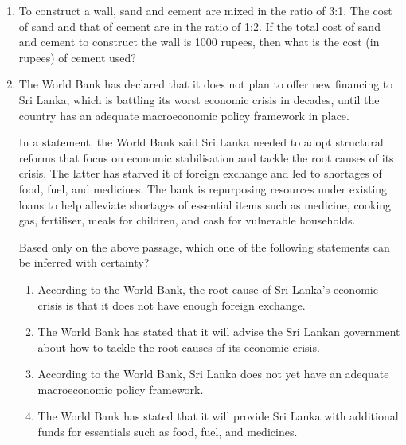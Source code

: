 \documentclass[journal,12pt,onecolumn]{IEEEtran}
\theoremstyle{remark}
\begin{document}
\begin{enumerate}
\item To construct a wall, sand and cement are mixed in the ratio of 3:1.  
The cost of sand and that of cement are in the ratio of 1:2.  
If the total cost of sand and cement to construct the wall is 1000 rupees, then what is the cost (in rupees) of cement used?\hfill{}

\begin{enumerate}[label=\Alph*.]
\end{enumerate}

\item The World Bank has declared that it does not plan to offer new financing to Sri Lanka, which is battling its worst economic crisis in decades, until the country has an adequate macroeconomic policy framework in place.  

In a statement, the World Bank said Sri Lanka needed to adopt structural reforms that focus on economic stabilisation and tackle the root causes of its crisis.  
The latter has starved it of foreign exchange and led to shortages of food, fuel, and medicines.  
The bank is repurposing resources under existing loans to help alleviate shortages of essential items such as medicine, cooking gas, fertiliser, meals for children, and cash for vulnerable households.  

Based only on the above passage, which one of the following statements can be inferred with certainty?  \hfill{}

\begin{enumerate}[label=\Alph*.]
\item According to the World Bank, the root cause of Sri Lanka’s economic crisis is that it does not have enough foreign exchange. 
\item The World Bank has stated that it will advise the Sri Lankan government about how to tackle the root causes of its economic crisis.
\item According to the World Bank, Sri Lanka does not yet have an adequate macroeconomic policy framework.
\item The World Bank has stated that it will provide Sri Lanka with additional funds for essentials such as food, fuel, and medicines.
\end{enumerate}


\end{enumerate}
\end{document}
